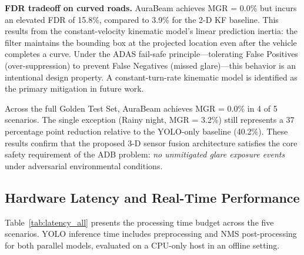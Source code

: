 \documentclass{jstarticle}
\theoremstyle{remark}
\begin{document}
\textbf{FDR tradeoff on curved roads.} AuraBeam achieves MGR = 0.0\%
but incurs an elevated FDR of 15.8\%, compared to 3.9\% for the 2-D
KF baseline. This results from the constant-velocity kinematic model's
linear prediction inertia: the filter maintains the bounding box at
the projected location even after the vehicle completes a curve.
Under the ADAS fail-safe principle---tolerating False Positives
(over-suppression) to prevent False Negatives (missed glare)---this
behavior is an intentional design property. A constant-turn-rate
kinematic model is identified as the primary mitigation in future
work.

Across the full Golden Test Set, AuraBeam achieves MGR = 0.0\% in 4
of 5 scenarios. The single exception (Rainy night, MGR = 3.2\%) still
represents a 37 percentage point reduction relative to the YOLO-only
baseline (40.2\%). These results confirm that the proposed 3-D sensor
fusion architecture satisfies the core safety requirement of the ADB
problem: \emph{no unmitigated glare exposure events} under adversarial
environmental conditions.

\subsection{Hardware Latency and Real-Time Performance}
\label{subsec:res_hw}

Table~\ref{tab:latency_all} presents the processing time budget across
the five scenarios. YOLO inference time includes preprocessing and
NMS post-processing for both parallel models, evaluated on a CPU-only
host in an offline setting.

\begin{table}[H]
\centering
\caption{Software latency and throughput analysis across five scenarios
         (offline evaluation environment)}
\label{tab:latency_all}
\end{table}
\end{document}
